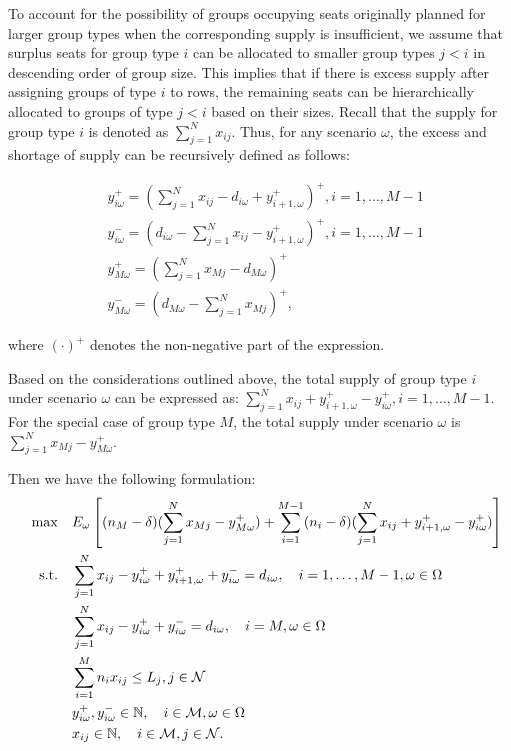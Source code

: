 To account for the possibility of groups occupying seats originally planned for larger group types when the corresponding supply is insufficient, we assume that surplus seats for group type $i$ can be 
allocated to smaller group types $j<i$ in descending order of group size. This implies that if there is excess supply after assigning groups of type $i$ to rows, the remaining seats can be hierarchically allocated to groups of type $j<i$ based on their sizes. Recall that the supply for group type $i$ is denoted as $\sum_{j=1}^N x_{ij}$. Thus, for any scenario $\omega$, the excess and shortage of supply can be recursively defined as follows:

\begin{equation}\label{y_recursively}
\begin{aligned}
  & y_{i \omega}^{+}= (\sum_{j=1}^N x_{ij}- d_{i \omega} + y_{i+1, \omega}^{+})^{+}, i =1,\ldots, M-1 \\
  & y_{i \omega}^{-}= (d_{i \omega}- \sum_{j=1}^N x_{ij} - y_{i+1, \omega}^{+})^{+}, i =1,\ldots, M-1 \\
  & y_{M \omega}^{+} = (\sum_{j=1}^N x_{Mj} - d_{M \omega})^{+} \\ 
  & y_{M \omega}^{-} = (d_{M \omega}- \sum_{j=1}^N x_{Mj})^{+},
\end{aligned}
\end{equation}

where $(\cdot)^{+}$ denotes the non-negative part of the expression. 

Based on the considerations outlined above, the total supply of group type $i$ under scenario $\omega$ can be expressed as: $\sum_{j= 1}^{N} x_{ij} + y_{i+1,\omega}^{+} - y_{i \omega}^{+}, i = 1, \ldots, M-1$. For the special case of group type $M$, the total supply under scenario $\omega$ is $\sum_{j= 1}^{N} x_{Mj} - y_{M \omega}^{+}$.

Then we have the following formulation:
  \begin{align}
  \quad \max \quad & E_{\omega}\left[(n_{M}-\delta) (\sum_{j= 1}^{N} x_{Mj} - y_{M \omega}^{+}) + \sum_{i=1}^{M-1} (n_i-\delta) (\sum_{j= 1}^{N} x_{ij} + y_{i+1,\omega}^{+} - y_{i \omega}^{+})\right] \\
  \text {s.t.} \quad & \sum_{j= 1}^{N} x_{ij}-y_{i \omega}^{+}+
  y_{i+1, \omega}^{+} + y_{i \omega}^{-}=d_{i \omega}, \quad i = 1,\ldots, M-1, \omega \in \Omega \label{DEF_constr1} \\
  & \sum_{j= 1}^{N} x_{ij} -y_{i \omega}^{+}+y_{i \omega}^{-}=d_{i \omega}, \quad i = M, \omega \in \Omega \label{DEF_constr2}\\
  & \sum_{i=1}^{M} n_{i} x_{ij} \leq L_j, j \in \mathcal{N}  \label{DEF_constr3} \\
  & y_{i \omega}^{+}, y_{i \omega}^{-} \in \mathbb{N}, \quad i \in \mathcal{M}, \omega \in \Omega \notag \\
  & x_{ij} \in \mathbb{N}, \quad i \in \mathcal{M}, j \in \mathcal{N} \notag.
  \end{align}

